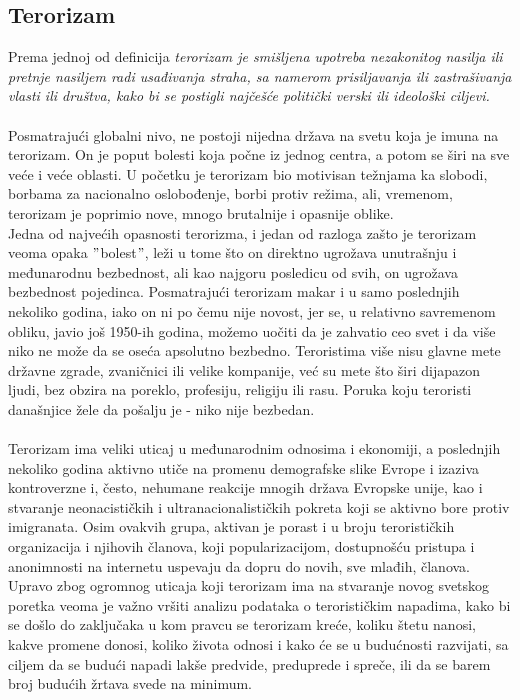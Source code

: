 \documentclass[a4paper]{article}
\begin{document}
\subsection{Terorizam}
Prema jednoj od definicija \textit{terorizam je smišljena upotreba nezakonitog nasilja ili pretnje nasiljem radi usađivanja straha, sa namerom prisiljavanja ili zastrašivanja vlasti ili društva, kako bi se postigli najčešće politički verski ili ideološki ciljevi.} \\\\
Posmatrajući globalni nivo, ne postoji nijedna država na svetu koja je imuna na terorizam. On je poput bolesti koja počne iz jednog centra, a potom se širi na sve veće i veće oblasti. U početku je terorizam bio motivisan težnjama ka slobodi, borbama za nacionalno oslobođenje, borbi protiv režima, ali, vremenom, terorizam je poprimio nove, mnogo brutalnije i opasnije oblike.\\
Jedna od najvećih opasnosti terorizma, i jedan od razloga zašto je terorizam veoma opaka $"$bolest$"$, leži u tome što on direktno ugrožava unutrašnju i međunarodnu bezbednost, ali kao najgoru posledicu od svih, on ugrožava bezbednost pojedinca. Posmatrajući terorizam makar i u samo poslednjih nekoliko godina, iako on ni po čemu nije novost, jer se, u relativno savremenom obliku, javio još 1950-ih godina, možemo uočiti da je zahvatio ceo svet i da više niko ne može da se oseća apsolutno bezbedno. Teroristima više nisu glavne mete državne zgrade, zvaničnici ili velike kompanije, već su mete što širi dijapazon ljudi, bez obzira na poreklo, profesiju, religiju ili rasu. Poruka koju teroristi današnjice žele da pošalju je - niko nije bezbedan. \\\\
Terorizam ima veliki uticaj u međunarodnim odnosima i ekonomiji, a poslednjih nekoliko godina aktivno utiče na promenu demografske slike Evrope i izaziva kontroverzne i, često, nehumane reakcije mnogih država Evropske unije, kao i stvaranje neonacističkih i ultranacionalističkih pokreta koji se aktivno bore protiv imigranata. Osim ovakvih grupa, aktivan je porast i u broju terorističkih organizacija i njihovih članova, koji popularizacijom, dostupnošću pristupa i anonimnosti na internetu uspevaju da dopru do novih, sve mlađih, članova.\\ Upravo zbog ogromnog uticaja koji terorizam ima na stvaranje novog svetskog poretka veoma je važno vršiti analizu podataka o terorističkim napadima, kako bi se došlo do zaključaka u kom pravcu se terorizam kreće, koliku štetu nanosi, kakve promene donosi, koliko života odnosi i kako će se u budućnosti razvijati, sa ciljem da se budući napadi lakše predvide, preduprede i spreče, ili da se barem broj budućih žrtava svede na minimum.
\end{document}
